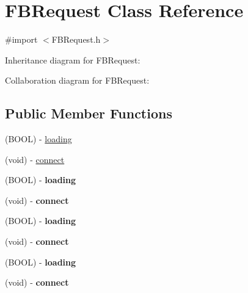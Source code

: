 \hypertarget{interface_f_b_request}{
\section{\-F\-B\-Request \-Class \-Reference}
\label{interface_f_b_request}
}


{\ttfamily \#import $<$\-F\-B\-Request.\-h$>$}



\-Inheritance diagram for \-F\-B\-Request\-:


\-Collaboration diagram for \-F\-B\-Request\-:
\subsection*{\-Public \-Member \-Functions}
\begin{DoxyCompactItemize}
\item 
(\-B\-O\-O\-L) -\/ \hyperlink{interface_f_b_request_ac1ee9d9844be6e903d395efbcc1b538c}{loading}
\item 
(void) -\/ \hyperlink{interface_f_b_request_a4ea039f98f82c65119e268bfd9239eeb}{connect}
\item 
\hypertarget{interface_f_b_request_ac1ee9d9844be6e903d395efbcc1b538c}{
(\-B\-O\-O\-L) -\/ {\bfseries loading}}
\label{interface_f_b_request_ac1ee9d9844be6e903d395efbcc1b538c}

\item 
\hypertarget{interface_f_b_request_a4ea039f98f82c65119e268bfd9239eeb}{
(void) -\/ {\bfseries connect}}
\label{interface_f_b_request_a4ea039f98f82c65119e268bfd9239eeb}

\item 
\hypertarget{interface_f_b_request_ac1ee9d9844be6e903d395efbcc1b538c}{
(\-B\-O\-O\-L) -\/ {\bfseries loading}}
\label{interface_f_b_request_ac1ee9d9844be6e903d395efbcc1b538c}

\item 
\hypertarget{interface_f_b_request_a4ea039f98f82c65119e268bfd9239eeb}{
(void) -\/ {\bfseries connect}}
\label{interface_f_b_request_a4ea039f98f82c65119e268bfd9239eeb}

\item 
\hypertarget{interface_f_b_request_ac1ee9d9844be6e903d395efbcc1b538c}{
(\-B\-O\-O\-L) -\/ {\bfseries loading}}
\label{interface_f_b_request_ac1ee9d9844be6e903d395efbcc1b538c}

\item 
\hypertarget{interface_f_b_request_a4ea039f98f82c65119e268bfd9239eeb}{
(void) -\/ {\bfseries connect}}
\label{interface_f_b_request_a4ea039f98f82c65119e268bfd9239eeb}


\end{DoxyCompactItemize}
